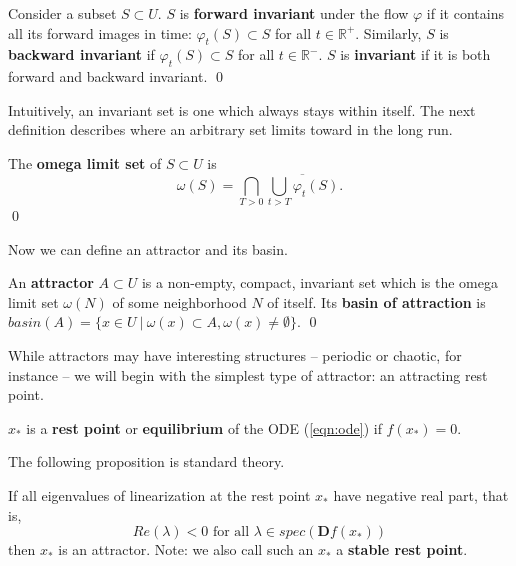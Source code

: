 \begin{definition}
	Consider a subset $S \subset U$. $S$ is \textbf{forward invariant} under the flow $\varphi$ if it contains all its forward images in time: $\varphi_t(S) \subset S$ for all $t \in \mathbb{R}^+$. Similarly, $S$ is \textbf{backward invariant} if $\varphi_t(S) \subset S$ for all $t \in \mathbb{R}^-$. $S$ is \textbf{invariant} if it is both forward and backward invariant. \qed
\end{definition}

Intuitively, an invariant set is one which always stays within itself. The next definition describes where an arbitrary set limits toward in the long run. 

\begin{definition}
	The \textbf{omega limit set} of $S \subset U$ is $$\omega(S)
	= \bigcap \limits_{T > 0} \overline{ \bigcup\limits_{t > T} \varphi_t(S) }.$$ \qed
\end{definition}


Now we can define an attractor and its basin.

\begin{definition}
	An \textbf{attractor} $A \subset U$ is a non-empty, compact, invariant set which is the omega limit set $\omega(N)$ of some neighborhood $N$ of itself. Its \textbf{basin of attraction} is $basin(A) = \{x \in U ~|~ \omega(x) \subset A, \omega(x) \neq \emptyset\}$. \qed
\end{definition}

While attractors may have interesting structures -- periodic or chaotic, for instance -- we will begin with the simplest type of attractor: an attracting rest point. 

\begin{definition}
	$x_\ast$ is a \textbf{rest point} or \textbf{equilibrium} of the ODE (\ref{eqn:ode}) if $f(x_\ast) = 0$.
\end{definition}


The following proposition is standard theory. 

\begin{proposition}
	If all eigenvalues of linearization at the rest point $x_{\ast}$ have negative real part, that is, $$Re(\lambda) < 0 \text{ for all } \lambda \in spec(\textbf{D}f(x_\ast))$$ 
	then $x_{\ast}$ is an attractor. Note: we also call such an $x_\ast$ a \textbf{stable rest point}. 
\end{proposition}



%


